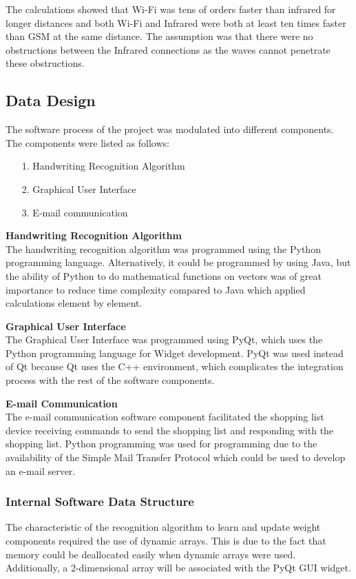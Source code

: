 The calculations showed that Wi-Fi was tens of orders faster than infrared for longer distances and both Wi-Fi and Infrared were both at least ten times faster than GSM at the same distance. The assumption was that there were no obstructions between the Infrared connections as the waves cannot penetrate these obstructions.
\newpage
\subsection{Data Design}
The software process of the project was modulated into different components. The components were listed as follows:
\begin{itemize}
	\item[1.]	Handwriting Recognition Algorithm
	\item[2.]	Graphical User Interface
	\item[3.]	E-mail communication
\end{itemize}

\textbf{Handwriting Recognition Algorithm}\\
The handwriting recognition algorithm was programmed using the Python programming language. Alternatively, it could be programmed by using Java, but the ability of Python to do mathematical functions on vectors was of great importance to reduce time complexity compared to Java which applied calculations element by element.

\textbf{Graphical User Interface}\\
The Graphical User Interface was programmed using PyQt, which uses the Python programming language for Widget development. PyQt was used instead of Qt because Qt uses the C++ environment, which complicates the integration process with the rest of the software components.

\textbf{E-mail Communication}\\
The e-mail communication software component facilitated the shopping list device receiving commands to send the shopping list and responding with the shopping list. Python programming was used for programming due to the availability of the Simple Mail Transfer Protocol which could be used to develop an e-mail server.

\subsubsection{Internal Software Data Structure}
The characteristic of the recognition algorithm to learn and update weight components required the use of  dynamic arrays. This is due to the fact that memory could be deallocated easily when dynamic arrays were used. Additionally, a 2-dimensional array will be associated with the PyQt GUI widget.

